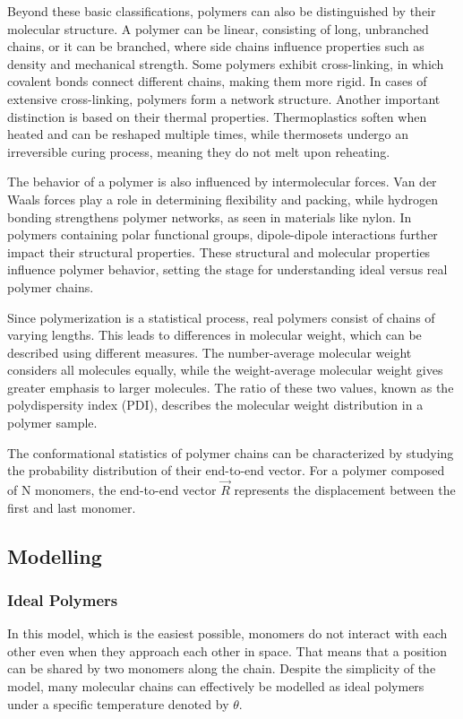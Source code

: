 \documentclass{article}      %
\begin{document}
Beyond these basic classifications, polymers can also be distinguished by their molecular structure. A polymer can be linear, consisting of long, unbranched chains, or it can be branched, where side chains influence properties such as density and mechanical strength. Some polymers exhibit cross-linking, in which covalent bonds connect different chains, making them more rigid. In cases of extensive cross-linking, polymers form a network structure. Another important distinction is based on their thermal properties. Thermoplastics soften when heated and can be reshaped multiple times, while thermosets undergo an irreversible curing process, meaning they do not melt upon reheating.

The behavior of a polymer is also influenced by intermolecular forces. Van der Waals forces play a role in determining flexibility and packing, while hydrogen bonding strengthens polymer networks, as seen in materials like nylon. In polymers containing polar functional groups, dipole-dipole interactions further impact their structural properties. These structural and molecular properties influence polymer behavior, setting the stage for understanding ideal versus real polymer chains.

Since polymerization is a statistical process, real polymers consist of chains of varying lengths. This leads to differences in molecular weight, which can be described using different measures. The number-average molecular weight considers all molecules equally, while the weight-average molecular weight gives greater emphasis to larger molecules. The ratio of these two values, known as the polydispersity index (PDI), describes the molecular weight distribution in a polymer sample.

The conformational statistics of polymer chains can be characterized by studying the probability distribution of their end-to-end vector. For a polymer composed of N monomers, the end-to-end vector $\vec{R}$ represents the displacement between the first and last monomer.



\subsection{Modelling}

\subsubsection{Ideal Polymers}
In this model, which is the easiest possible, monomers do not interact with each other even when they approach each other in space. That means that a position can be shared by two monomers along the chain.
Despite the simplicity of the model, many molecular chains can effectively be modelled as ideal polymers under a specific temperature denoted by $\theta$.
\end{document}
